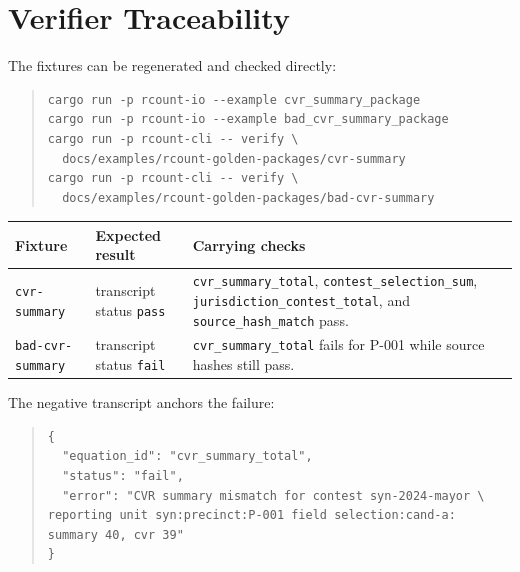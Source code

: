 \section{Verifier Traceability}

The fixtures can be regenerated and checked directly:

\begin{quote}
\footnotesize
\begin{verbatim}
cargo run -p rcount-io --example cvr_summary_package
cargo run -p rcount-io --example bad_cvr_summary_package
cargo run -p rcount-cli -- verify \
  docs/examples/rcount-golden-packages/cvr-summary
cargo run -p rcount-cli -- verify \
  docs/examples/rcount-golden-packages/bad-cvr-summary
\end{verbatim}
\end{quote}

\begin{center}
\small
\begin{tabularx}{\textwidth}{lXX}
\toprule
Fixture & Expected result & Carrying checks \\
\midrule
\texttt{cvr-summary} & transcript status \texttt{pass} & \texttt{cvr\_summary\_total}, \texttt{contest\_selection\_sum}, \texttt{jurisdiction\_contest\_total}, and \texttt{source\_hash\_match} pass. \\
\texttt{bad-cvr-summary} & transcript status \texttt{fail} & \texttt{cvr\_summary\_total} fails for P-001 while source hashes still pass. \\
\bottomrule
\end{tabularx}
\end{center}

The negative transcript anchors the failure:

\begin{quote}
\footnotesize
\begin{verbatim}
{
  "equation_id": "cvr_summary_total",
  "status": "fail",
  "error": "CVR summary mismatch for contest syn-2024-mayor \
reporting unit syn:precinct:P-001 field selection:cand-a: summary 40, cvr 39"
}
\end{verbatim}
\end{quote}
